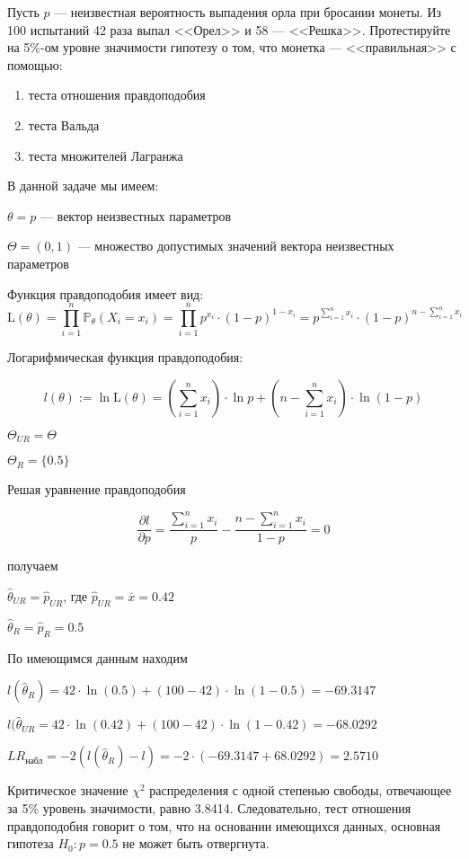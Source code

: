 \documentclass[pdftex,11pt,openany]{book}\usepackage[]{graphicx}\usepackage[]{color}
\begin{document}
\begin{problem}
Пусть $p$ --- неизвестная вероятность выпадения орла при бросании монеты. Из 100 испытаний  42 раза выпал <<Орел>> и 58 --- <<Решка>>. Протестируйте на 5\%-ом уровне значимости гипотезу о том, что монетка --- <<правильная>> с помощью:
\begin{enumerate}
\item теста отношения правдоподобия
\item теста Вальда
\item теста множителей Лагранжа
\end{enumerate}
\end{problem}

\begin{solution}
В данной задаче мы имеем:

$\theta = p$ --- вектор неизвестных параметров

$\Theta = (0, 1)$ --- множество допустимых значений вектора неизвестных параметров

Функция правдоподобия имеет вид:
$$\text{L}(\theta) = \prod_{i=1}^n \mathbb{P}_{\theta}(X_i = x_i) = \prod_{i=1}^n p^{x_i} \cdot (1-p)^{1-x_i} = p^{\sum_{i=1}^n x_i} \cdot (1-p)^{n - \sum_{i=1}^n x_i}$$

Логарифмическая функция правдоподобия:

$$l(\theta) := \ln \text{L}(\theta) = \left( \sum_{i=1}^n x_i \right) \cdot \ln p + \left(n - \sum_{i=1}^n x_i \right) \cdot \ln (1 - p)$$

$\Theta_{UR} = \Theta$

$\Theta_{R} = \{0.5\}$

Решая уравнение правдоподобия

$$\frac{\partial l}{\partial p} = \frac{\sum_{i=1}^n x_i}{p} - \frac{n - \sum_{i=1}^n x_i}{1 - p} = 0$$

получаем

$\hat{\theta}_{UR} = \hat{p}_{UR}$, где $\hat{p}_{UR} = \overline{x} = 0.42$

$\hat{\theta}_{R} = \hat{p}_{R} = 0.5$

По имеющимся данным находим

$l(\hat{\theta}_{R}) = 42 \cdot \ln(0.5) + (100-42) \cdot \ln(1-0.5) = -69.3147$

$l(\hat{\theta}_{UR} = 42 \cdot \ln(0.42) + (100-42) \cdot \ln(1-0.42) = -68.0292$

$LR_{\text{набл}} = -2(l(\hat{\theta}_{R}) - l) = -2 \cdot (-69.3147 + 68.0292) = 2.5710$

Критическое значение $\chi^2$ распределения с одной степенью свободы, отвечающее за 5\% уровень значимости, равно 3.8414. Следовательно, тест отношения правдоподобия говорит о том, что на основании имеющихся данных, основная гипотеза $H_0: p = 0.5$ не может быть отвергнута.


\end{solution}
\end{document}
